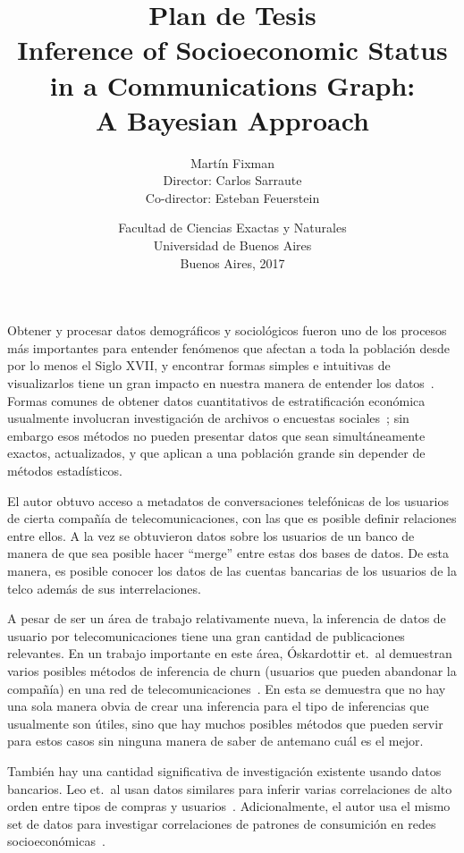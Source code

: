 \documentclass{article}
\title{Plan de Tesis\\\vspace{1em}\Large Inference of Socioeconomic Status\\in a Communications Graph:\\A Bayesian Approach}
\author{{\Large Martín Fixman}\\Director: Carlos Sarraute\\Co-director: Esteban Feuerstein}
\date{{\large Facultad de Ciencias Exactas y Naturales}\\{\large Universidad de Buenos Aires}\\Buenos Aires, 2017}
\begin{document}
\maketitle

\section*{}

Obtener y procesar datos demográficos y sociológicos fueron uno de los procesos más importantes para entender fenómenos que afectan a toda la población desde por lo menos el Siglo XVII, y encontrar formas simples e intuitivas de visualizarlos tiene un gran impacto en nuestra manera de entender los datos~\citep{minard1844,snow1855}. Formas comunes de obtener datos cuantitativos de estratificación económica usualmente involucran investigación de archivos o encuestas sociales~\citep{bulmer1977}; sin embargo esos métodos no pueden presentar datos que sean simultáneamente exactos, actualizados, y que aplican a una población grande sin depender de métodos estadísticos.

El autor obtuvo acceso a metadatos de conversaciones telefónicas de los usuarios de cierta compañía de telecomunicaciones, con las que es posible definir relaciones entre ellos. A la vez se obtuvieron datos sobre los usuarios de un banco de manera de que sea posible hacer ``merge'' entre estas dos bases de datos. De esta manera, es posible conocer los datos de las cuentas bancarias de los usuarios de la telco además de sus interrelaciones.

A pesar de ser un área de trabajo relativamente nueva, la inferencia de datos de usuario por telecomunicaciones tiene una gran cantidad de publicaciones relevantes. En un trabajo importante en este área, Óskardottir et.\ al demuestran varios posibles métodos de inferencia de churn (usuarios que pueden abandonar la compañía) en una red de telecomunicaciones~\cite{oskardottir2016}. En esta se demuestra que no hay una sola manera obvia de crear una inferencia para el tipo de inferencias que usualmente son útiles, sino que hay muchos posibles métodos que pueden servir para estos casos sin ninguna manera de saber de antemano cuál es el mejor.

También hay una cantidad significativa de investigación existente usando datos bancarios. Leo et.\ al usan datos similares para inferir varias correlaciones de alto orden entre tipos de compras y usuarios~\cite{leo2015socioeconomic}. Adicionalmente, el autor usa el mismo set de datos para investigar correlaciones de patrones de consumición en redes socioeconómicas~\cite{leo16correlations}.
\end{document}
